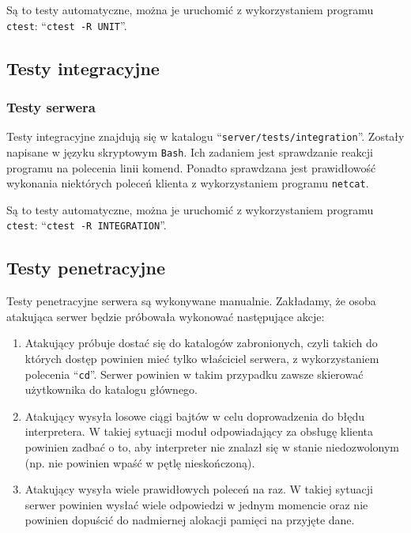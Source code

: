\documentclass[8pt,a4paper]{article}
\newcommand{\quotes}[1]{``#1''}
\newcommand{\quotcode}[1]{\quotes{\texttt{#1}}}
\begin{document}
Są to testy automatyczne, można je uruchomić z wykorzystaniem programu \texttt{ctest}: \quotcode{ctest -R UNIT}.

\subsection{Testy integracyjne}
\subsubsection{Testy serwera}
Testy integracyjne znajdują się w katalogu \quotcode{server/tests/integration}. Zostały napisane w języku skryptowym \texttt{Bash}. Ich zadaniem jest sprawdzanie reakcji programu na polecenia linii komend. Ponadto sprawdzana jest prawidłowość wykonania niektórych poleceń klienta z wykorzystaniem programu \texttt{netcat}.

Są to testy automatyczne, można je uruchomić z wykorzystaniem programu \texttt{ctest}: \quotcode{ctest -R INTEGRATION}.

\subsection{Testy penetracyjne}
Testy penetracyjne serwera są wykonywane manualnie. Zakładamy, że osoba atakująca serwer będzie próbowała wykonować następujące akcje:
\begin{enumerate}
    \item Atakujący próbuje dostać się do katalogów zabronionych, czyli takich do których dostęp powinien mieć tylko właściciel serwera, z wykorzystaniem polecenia \quotcode{cd}. Serwer powinien w takim przypadku zawsze skierować użytkownika do katalogu głównego.
    \item Atakujący wysyła losowe ciągi bajtów w celu doprowadzenia do błędu interpretera. W takiej sytuacji moduł odpowiadający za obsługę klienta powinien zadbać o to, aby interpreter nie znalazł się w stanie niedozwolonym (np. nie powinien wpaść w pętlę nieskończoną).
    \item Atakujący wysyła wiele prawidłowych poleceń na raz. W takiej sytuacji serwer powinien wysłać wiele odpowiedzi w jednym momencie oraz nie powinien dopuścić do nadmiernej alokacji pamięci na przyjęte dane.
\end{enumerate}
\end{document}
